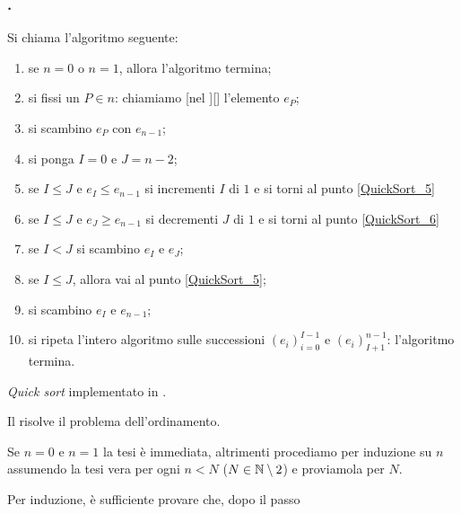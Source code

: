 \subsubsection{.}
\label{AlgoritmiEStruttureDiDati_QuickSort}
\begin{Definition}
	Si chiama
  l'algoritmo seguente:
  \begin{enumerate}
    \item\label{QuickSort_1} se $n = 0$ o $n = 1$, allora l'algoritmo termina;
    \item\label{QuickSort_2} si fissi un $P \in n$: chiamiamo
      [nel ][]
      l'elemento $e_P$;
    \item\label{QuickSort_3} si scambino $e_P$ con $e_{n - 1}$;
    \item\label{QuickSort_4} si ponga $I = 0$ e $J = n - 2$;
    \item\label{QuickSort_5} se
      $I \leq J$ e $e_I \leq e_{n - 1}$
      si incrementi $I$ di $1$ e si torni al punto
      \ref{QuickSort_5}
    \item\label{QuickSort_6} se
      $I \leq J$ e $e_J \geq e_{n - 1}$
      si decrementi $J$ di $1$ e si torni al punto
      \ref{QuickSort_6}
    \item\label{QuickSort_7} se $I < J$ si scambino
      $e_I$ e $e_J$;
    \item\label{QuickSort_8} se $I \leq J$, allora vai al punto
      \ref{QuickSort_5};
    \item\label{QuickSort_9} si scambino
      $e_I$ e $e_{n - 1}$;
    \item\label{QuickSort_10} si ripeta l'intero algoritmo sulle successioni
      $(e_i)_{i = 0}^{I - 1}$ e $(e_i)_{I + 1}^{n - 1}$: l'algoritmo termina.
  \end{enumerate}
\end{Definition}
\begin{listing}
	\caption{\textit{Quick sort} implementato in .}
\end{listing}
\begin{Theorem}
	Il  risolve il problema dell'ordinamento.
\end{Theorem}
\Proof Se $n = 0$ e $n = 1$ la tesi \`e immediata, altrimenti procediamo
per induzione su $n$ assumendo la tesi vera per ogni $n < N$
($N \in \mathbb{N} \setminus 2$) e proviamola per $N$.
\par Per induzione, \`e sufficiente provare che, dopo il passo
